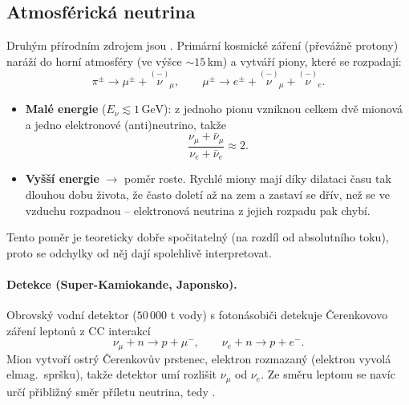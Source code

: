 \subsection{Atmosférická neutrina}

Druhým přírodním zdrojem jsou . Primární kosmické záření (převážně protony) naráží do horní atmosféry (ve výšce \(\sim15\,\mathrm{km}\)) a vytváří piony, které se rozpadají:
\[
  \pi^\pm\to\mu^\pm+\overset{(-)}{\nu}_{\!\mu},\qquad
  \mu^\pm\to e^\pm+\overset{(-)}{\nu}_{\!\mu}+\overset{(-)}{\nu}_{\!e}.
\]
\begin{itemize}[nosep]
  \item \textbf{Malé energie} (\(E_\nu\lesssim1\,\mathrm{GeV}\)): z jednoho pionu vzniknou celkem dvě mionová a jedno elektronové (anti)neutrino, takže
  \[
    \frac{\nu_\mu+\bar\nu_\mu}{\nu_e+\bar\nu_e}\approx2.
  \]
  \item \textbf{Vyšší energie} \(\to\) poměr roste. Rychlé miony mají díky dilataci času tak dlouhou dobu života, že často doletí až na zem a zastaví se dřív, než se ve vzduchu rozpadnou -- elektronová neutrina z jejich rozpadu pak chybí.
\end{itemize}
Tento poměr je teoreticky dobře spočitatelný (na rozdíl od absolutního toku), proto se odchylky od něj dají spolehlivě interpretovat.

\paragraph{Detekce (Super-Kamiokande, Japonsko).} Obrovský vodní detektor (\(50\,000\) t vody) s fotonásobiči detekuje Čerenkovovo záření leptonů z CC interakcí
\[
  \nu_\mu+n\to p+\mu^-,\qquad \nu_e+n\to p+e^-.
\]
Mion vytvoří ostrý Čerenkovův prstenec, elektron rozmazaný (elektron vyvolá elmag.\ spršku), takže detektor umí rozlišit \(\nu_\mu\) od \(\nu_e\). Ze směru leptonu se navíc určí přibližný směr příletu neutrina, tedy .

\begin{center}
\end{center}

